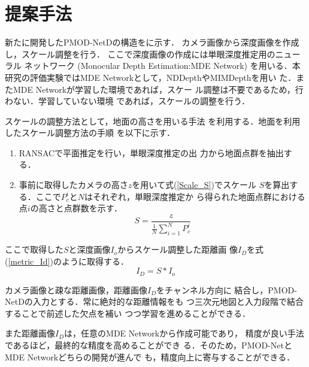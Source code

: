 \section{提案手法}

新たに開発したPMOD-NetDの構造をに示す．
カメラ画像から深度画像を作成し，スケール調整を行う．
ここで深度画像の作成には単眼深度推定用のニューラル
ネットワーク (Monocular Depth Estimation:MDE Network) を用いる．本研究の評価実験ではMDE
Networkとして，NDDepth\cite{1}やMIMDepth\cite{2}を用い
た．またMDE Networkが学習した環境であれば，スケー
ル調整は不要であるため，行わない．学習していない環境
であれば，スケールの調整を行う．

スケールの調整方法として，地面の高さを用いる手法
\cite{11}を利用する．地面を利用したスケール調整方法の手順
を以下に示す．
\begin{enumerate}[1.]
    \item RANSAC\cite{12}で平面推定を行い，単眼深度推定の出
    力から地面点群を抽出する．
    \item 事前に取得したカメラの高さ$z$を用いて式(\ref{Scale_S})でスケール
    $S$を算出する．ここで$P_c^{i}$と$N$はそれぞれ，単眼深度推定か
    ら得られた地面点群における点$i$の高さと点群数を示す．
    \begin{equation}
        \label{Scale_S}
        S= \frac{z}{\frac{1}{N}{}\sum_{i=1}^{N}P_c^{i}} 
    \end{equation}
\end{enumerate}

ここで取得した$S$と深度画像$I_o$からスケール調整した距離画
像$I_D$を式(\ref{metric_Id})のように取得する．
\begin{equation}
    \label{metric_Id}
    I_D=S*I_o
\end{equation}

カメラ画像と疎な距離画像，距離画像$I_D$をチャンネル方向に
結合し，PMOD-NetDの入力とする．常に絶対的な距離情報をも
つ三次元地図と入力段階で結合することで前述した欠点を補い
つつ学習を進めることができる．

また距離画像$I_D$は，任意のMDE Networkから作成可能であり，
精度が良い手法であるほど，最終的な精度を高めることができ
る．そのため，PMOD-NetとMDE Networkどちらの開発が進んで
も，精度向上に寄与することができる．